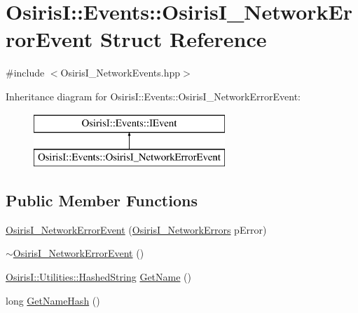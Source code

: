 \hypertarget{struct_osiris_i_1_1_events_1_1_osiris_i___network_error_event}{\section{Osiris\-I\-:\-:Events\-:\-:Osiris\-I\-\_\-\-Network\-Error\-Event Struct Reference}
\label{struct_osiris_i_1_1_events_1_1_osiris_i___network_error_event}
}


{\ttfamily \#include $<$Osiris\-I\-\_\-\-Network\-Events.\-hpp$>$}

Inheritance diagram for Osiris\-I\-:\-:Events\-:\-:Osiris\-I\-\_\-\-Network\-Error\-Event\-:\begin{figure}[H]
\begin{center}
\leavevmode
\includegraphics[height=2.000000cm]{struct_osiris_i_1_1_events_1_1_osiris_i___network_error_event}
\end{center}
\end{figure}
\subsection*{Public Member Functions}
\begin{DoxyCompactItemize}
\item 
\hyperlink{struct_osiris_i_1_1_events_1_1_osiris_i___network_error_event_afe8022a4440a86632402a6c647b68884}{Osiris\-I\-\_\-\-Network\-Error\-Event} (\hyperlink{namespace_osiris_i_1_1_events_a9349e2e7af9d6c26d7ce997b34a12253}{Osiris\-I\-\_\-\-Network\-Errors} p\-Error)
\item 
\hyperlink{struct_osiris_i_1_1_events_1_1_osiris_i___network_error_event_a6d66632249e31aaeef147956b705c905}{$\sim$\-Osiris\-I\-\_\-\-Network\-Error\-Event} ()
\item 
\hyperlink{class_osiris_i_1_1_utilities_1_1_hashed_string}{Osiris\-I\-::\-Utilities\-::\-Hashed\-String} \hyperlink{struct_osiris_i_1_1_events_1_1_osiris_i___network_error_event_ab7e1e4d846eca0d46cb6fc6f1bea1ac4}{Get\-Name} ()
\item 
long \hyperlink{struct_osiris_i_1_1_events_1_1_osiris_i___network_error_event_a30a68e8242bbc9cdc9ecc49aa2e14191}{Get\-Name\-Hash} ()
\end{DoxyCompactItemize}
